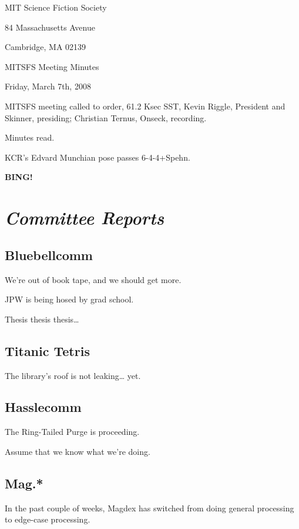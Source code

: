 \documentclass[10pt]{article}
\newcommand{\bing}{{\bf BING!} }
\newcommand{\goto}[1]{\bing \vskip 12pt \section*{{\em{#1}}}}
\begin{document}
\begin{center}

MIT Science Fiction Society

84 Massachusetts Avenue

Cambridge, MA 02139

\vspace{12pt}

MITSFS Meeting Minutes

Friday, March 7th, 2008

\end{center}

\vspace{18pt}

\setlength{\parskip}{6pt}

\noindent
MITSFS meeting called to order, 61.2 Ksec SST,
Kevin Riggle, President and Skinner, presiding; Christian Ternus, Onseck, recording.

Minutes read.

KCR's Edvard Munchian pose passes 6-4-4+Spehn.

\BING

\goto{Committee Reports}

\subsection*{Bluebellcomm}

We're out of book tape, and we should get more.

JPW is being hosed by grad school.

Thesis thesis thesis\ldots{}

\subsection*{Titanic Tetris}

The library's roof is not leaking\ldots{} yet.

\subsection*{Hasslecomm}

The Ring-Tailed Purge is proceeding.

Assume that we know what we're doing.

\subsection*{Mag.*}

In the past couple of weeks, Magdex has switched from doing general processing to edge-case processing.
\end{document}
